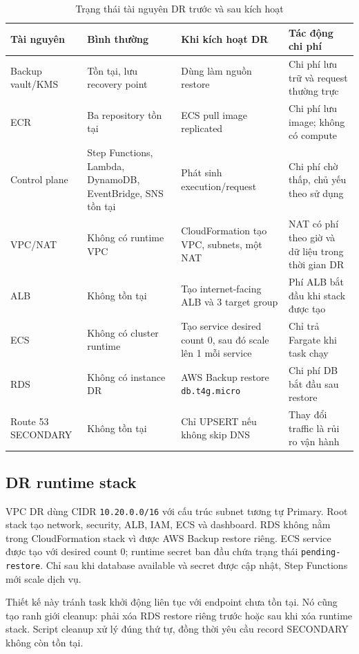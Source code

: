 \begin{table}[H]
\centering
\caption{Trạng thái tài nguyên DR trước và sau kích hoạt}
\label{tab:dr-resource-state}
\begin{tabularx}{\textwidth}{@{}p{2.8cm}p{3.4cm}p{4cm}X@{}}
\toprule
\textbf{Tài nguyên} & \textbf{Bình thường} & \textbf{Khi kích hoạt DR} & \textbf{Tác động chi phí} \\
\midrule
Backup vault/KMS & Tồn tại, lưu recovery point & Dùng làm nguồn restore & Chi phí lưu trữ và request thường trực \\
ECR & Ba repository tồn tại & ECS pull image replicated & Chi phí lưu image; không có compute \\
Control plane & Step Functions, Lambda, DynamoDB, EventBridge, SNS tồn tại & Phát sinh execution/request & Chi phí chờ thấp, chủ yếu theo sử dụng \\
VPC/NAT & Không có runtime VPC & CloudFormation tạo VPC, subnets, một NAT & NAT có phí theo giờ và dữ liệu trong thời gian DR \\
ALB & Không tồn tại & Tạo internet-facing ALB và 3 target group & Phí ALB bắt đầu khi stack được tạo \\
ECS & Không có cluster runtime & Tạo service desired count 0, sau đó scale lên 1 mỗi service & Chỉ trả Fargate khi task chạy \\
RDS & Không có instance DR & AWS Backup restore \texttt{db.t4g.micro} & Chi phí DB bắt đầu sau restore \\
Route 53 SECONDARY & Không tồn tại & Chỉ UPSERT nếu không skip DNS & Thay đổi traffic là rủi ro vận hành \\
\bottomrule
\end{tabularx}
\end{table}

\subsection{DR runtime stack}

VPC DR dùng CIDR \texttt{10.20.0.0/16} với cấu trúc subnet tương tự Primary. Root stack tạo network, security, ALB, IAM, ECS và dashboard. RDS không nằm trong CloudFormation stack vì được AWS Backup restore riêng. ECS service được tạo với desired count 0; runtime secret ban đầu chứa trạng thái \texttt{pending-restore}. Chỉ sau khi database available và secret được cập nhật, Step Functions mới scale dịch vụ.

Thiết kế này tránh task khởi động liên tục với endpoint chưa tồn tại. Nó cũng tạo ranh giới cleanup: phải xóa RDS restore riêng trước hoặc sau khi xóa runtime stack. Script cleanup xử lý đúng thứ tự, đồng thời yêu cầu record SECONDARY không còn tồn tại.

